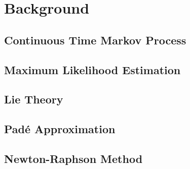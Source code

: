 \section{Background}
\subsection{Continuous Time Markov Process}
\subsection{Maximum Likelihood Estimation}
\subsection{Lie Theory}
\subsection{Pad\'{e} Approximation}
\subsection{Newton-Raphson Method}

